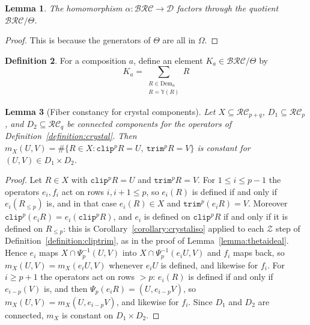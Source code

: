 \documentclass{amsart}
\newtheorem{lemma}{Lemma}[subsection]
\theoremstyle{definition}
\newtheorem{definition}[lemma]{Definition}
\theoremstyle{remark}
\numberwithin{equation}{subsection}
\newcommand{\trm}{\mathtt{trim}}
\newcommand{\zeromap}{\mathcal{Z}}
\newcommand{\clp}{\mathtt{clip}}
\newcommand{\BRC}{\mathcal{BRC}}
\newcommand{\RC}{\mathcal{RC}}
\newcommand{\dcoma}{\mathcal{D}}
\begin{document}
\begin{lemma}
  The homomorphism $\alpha:\BRC\to\dcoma$ factors through the quotient $\BRC/\Theta$.
\end{lemma}
\begin{proof}
This is because the generators of $\Theta$ are all in $\Omega$.
\end{proof}

\begin{definition}
For a composition $a$, define  an element $K_a\in\BRC/\Theta$ by
$$K_a =\sum_{\substack{R\in\mathrm{Dem}_a\\ R=\mathbb{Y}(R)}} R$$
\end{definition}

\begin{lemma}[Fiber constancy for crystal components]\label{lemma:keyfibers}
Let $X\subseteq\RC_{p+q}$, $D_1\subseteq\RC_p$, and $D_2\subseteq\RC_q$ be connected components for the operators of Definition~\ref{definition:crystal}. Then $m_X(U,V)=\#\{R\in X:\clp^pR=U,\ \trm^pR=V\}$ is constant for $(U,V)\in D_1\times D_2$.
\end{lemma}
\begin{proof}
Let $R\in X$ with $\clp^pR=U$ and $\trm^pR=V$. For $1\leq i\leq p-1$ the operators $e_i,f_i$ act on rows $i,i+1\leq p$, so $e_i(R)$ is defined if and only if $e_i(R_{\leq p})$ is, and in that case $e_i(R)\in X$ and $\trm^p(e_iR)=V$. Moreover $\clp^p(e_iR)=e_i(\clp^pR)$, and $e_i$ is defined on $\clp^pR$ if and only if it is defined on $R_{\leq p}$: this is Corollary~\ref{corollary:crystaliso} applied to each $\zeromap$ step of Definition~\ref{definition:cliptrim}, as in the proof of Lemma~\ref{lemma:thetaideal}. Hence $e_i$ maps $X\cap\Psi_p^{-1}(U,V)$ into $X\cap\Psi_p^{-1}(e_iU,V)$ and $f_i$ maps back, so $m_X(U,V)=m_X(e_iU,V)$ whenever $e_iU$ is defined, and likewise for $f_i$. For $i\geq p+1$ the operators act on rows $>p$: $e_i(R)$ is defined if and only if $e_{i-p}(V)$ is, and then $\Psi_p(e_iR)=(U,e_{i-p}V)$, so $m_X(U,V)=m_X(U,e_{i-p}V)$, and likewise for $f_i$. Since $D_1$ and $D_2$ are connected, $m_X$ is constant on $D_1\times D_2$.
\end{proof}
\end{document}
